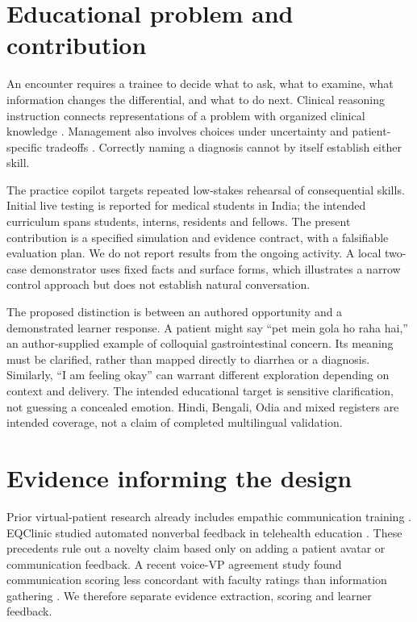 \documentclass[pmlr,twocolumn,10pt]{jmlr}
\begin{document}
\section{Educational problem and contribution}
An encounter requires a trainee to decide what to ask, what to examine, what information changes the differential, and what to do next. Clinical reasoning instruction connects representations of a problem with organized clinical knowledge \citep{bowen2006}. Management also involves choices under uncertainty and patient-specific tradeoffs \citep{haimovich2026}. Correctly naming a diagnosis cannot by itself establish either skill.

The practice copilot targets repeated low-stakes rehearsal of consequential skills. Initial live testing is reported for medical students in India; the intended curriculum spans students, interns, residents and fellows. The present contribution is a specified simulation and evidence contract, with a falsifiable evaluation plan. We do not report results from the ongoing activity. A local two-case demonstrator uses fixed facts and surface forms, which illustrates a narrow control approach but does not establish natural conversation.

The proposed distinction is between an authored opportunity and a demonstrated learner response. A patient might say ``pet mein gola ho raha hai,'' an author-supplied example of colloquial gastrointestinal concern. Its meaning must be clarified, rather than mapped directly to diarrhea or a diagnosis. Similarly, ``I am feeling okay'' can warrant different exploration depending on context and delivery. The intended educational target is sensitive clarification, not guessing a concealed emotion. Hindi, Bengali, Odia and mixed registers are intended coverage, not a claim of completed multilingual validation.

\section{Evidence informing the design}
Prior virtual-patient research already includes empathic communication training \citep{foster2016}. EQClinic studied automated nonverbal feedback in telehealth education \citep{liu2016}. These precedents rule out a novelty claim based only on adding a patient avatar or communication feedback. A recent voice-VP agreement study found communication scoring less concordant with faculty ratings than information gathering \citep{gao2026}. We therefore separate evidence extraction, scoring and learner feedback.
\end{document}
